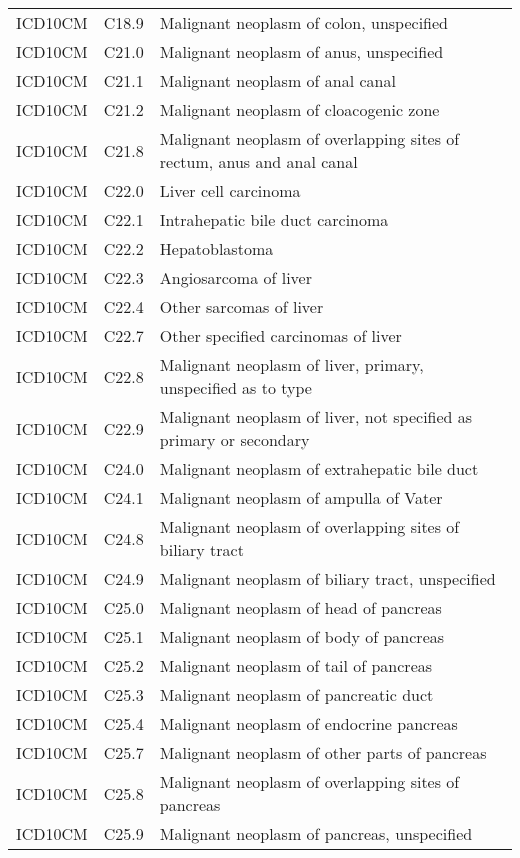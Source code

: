 \begin{table}[ht]
\begin{tabular}{lll}
  ICD10CM & C18.9 & Malignant neoplasm of colon, unspecified \\ 
  ICD10CM & C21.0 & Malignant neoplasm of anus, unspecified \\ 
  ICD10CM & C21.1 & Malignant neoplasm of anal canal \\ 
  ICD10CM & C21.2 & Malignant neoplasm of cloacogenic zone \\ 
  ICD10CM & C21.8 & Malignant neoplasm of overlapping sites of rectum, anus and anal canal \\ 
  ICD10CM & C22.0 & Liver cell carcinoma \\ 
  ICD10CM & C22.1 & Intrahepatic bile duct carcinoma \\ 
  ICD10CM & C22.2 & Hepatoblastoma \\ 
  ICD10CM & C22.3 & Angiosarcoma of liver \\ 
  ICD10CM & C22.4 & Other sarcomas of liver \\ 
  ICD10CM & C22.7 & Other specified carcinomas of liver \\ 
  ICD10CM & C22.8 & Malignant neoplasm of liver, primary, unspecified as to type \\ 
  ICD10CM & C22.9 & Malignant neoplasm of liver, not specified as primary or secondary \\ 
  ICD10CM & C24.0 & Malignant neoplasm of extrahepatic bile duct \\ 
  ICD10CM & C24.1 & Malignant neoplasm of ampulla of Vater \\ 
  ICD10CM & C24.8 & Malignant neoplasm of overlapping sites of biliary tract \\ 
  ICD10CM & C24.9 & Malignant neoplasm of biliary tract, unspecified \\ 
  ICD10CM & C25.0 & Malignant neoplasm of head of pancreas \\ 
  ICD10CM & C25.1 & Malignant neoplasm of body of pancreas \\ 
  ICD10CM & C25.2 & Malignant neoplasm of tail of pancreas \\ 
  ICD10CM & C25.3 & Malignant neoplasm of pancreatic duct \\ 
  ICD10CM & C25.4 & Malignant neoplasm of endocrine pancreas \\ 
  ICD10CM & C25.7 & Malignant neoplasm of other parts of pancreas \\ 
  ICD10CM & C25.8 & Malignant neoplasm of overlapping sites of pancreas \\ 
  ICD10CM & C25.9 & Malignant neoplasm of pancreas, unspecified \\ 

\end{tabular}
\end{table}
